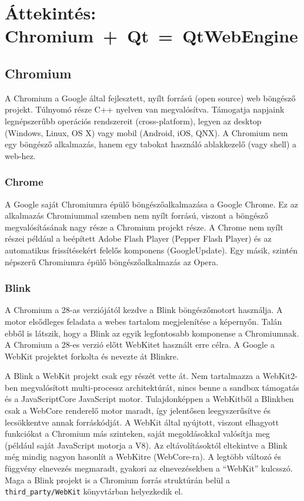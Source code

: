 \documentclass[12pt]{report}
\begin{document}
\chapter{Áttekintés: \mbox{Chromium + Qt = QtWebEngine}}

\section{Chromium}
A Chromium a Google által fejlesztett, nyílt forrású (open source) web böngésző projekt.
Túlnyomó része C++ nyelven van megvalósítva. Támogatja napjaink legnépszerűbb operációs
rendszereit (cross-platform), legyen az desktop (Windows, Linux, OS X) vagy mobil
(Android, iOS, QNX).
A Chromium nem egy böngésző alkalmazás, hanem egy tabokat használó ablakkezelő (vagy shell)
a web-hez.
\cite{bib:wiki-chromium}

\subsection{Chrome}
A Google saját Chromiumra épülő böngészőalkalmazása a Google Chrome.
Ez az alkalmazás Chromiummal szemben nem nyílt forrású, viszont a böngésző
megvalósításának nagy része a Chromium projekt része.
A Chrome nem nyílt részei például a beépített Adobe Flash Player (Pepper Flash Player)
és az automatikus frissítésekért felelős komponens (GoogleUpdate). \cite{bib:wiki-chrome}
Egy másik, szintén népszerű Chromiumra épülő böngészőalkalmazás az Opera.

\subsection{Blink}
A Chromium a 28-as verziójától kezdve a Blink böngészőmotort használja.
A motor elsődleges feladata a webes tartalom megjelenítése a képernyőn. Talán
ebből is látszik, hogy a Blink az egyik legfontosabb komponense a Chromiumnak.
A Chromium a 28-es verzió előtt WebKitet használt erre célra. A Google a WebKit projektet
forkolta és nevezte át Blinkre.
\cite{bib:wiki-blink}

A Blink a WebKit projekt csak egy részét vette át. Nem tartalmazza a WebKit2-ben megvalósított
multi-processz architektúrát, nincs benne a sandbox támogatás és a JavaScriptCore JavaScript
motor. Tulajdonképpen a WebKitből a Blinkben csak a WebCore
renderelő motor maradt, így jelentősen leegyszerűsítve és lecsökkentve annak
forráskódját. A WebKit által nyújtott, viszont elhagyott funkciókat a Chromium más szinteken,
saját megoldásokkal valósítja meg (például saját JavaScript motorja a V8). Az eltávolításoktól
eltekintve a Blink még mindig nagyon hasonlít a WebKitre (WebCore-ra). A legtöbb változó és
függvény elnevezés megmaradt, gyakori az elnevezésekben a ``WebKit'' kulcsszó. Maga a Blink
projekt is a Chromium forrás struktúrán belül a \texttt{third\_party/WebKit} könyvtárban
helyezkedik el.
\cite{bib:chromium-displays-web-pages, bib:chromium-blink}
\end{document}
